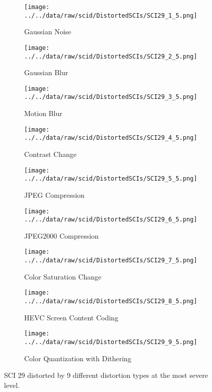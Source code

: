 \begin{figure}[h!]
    \centering
    \begin{subfigure}[b]{0.42\textwidth}
        \texttt{[image: ../../data/raw/scid/DistortedSCIs/SCI29\_1\_5.png]}
        \caption{Gaussian Noise}
        \label{fig:distortion_type_1}
    \end{subfigure}
    \hfill
    \begin{subfigure}[b]{0.42\textwidth}
        \texttt{[image: ../../data/raw/scid/DistortedSCIs/SCI29\_2\_5.png]}
        \caption{Gaussian Blur}
        \label{fig:distortion_type_2}
    \end{subfigure}
    \newline
    \begin{subfigure}[b]{0.42\textwidth}
        \texttt{[image: ../../data/raw/scid/DistortedSCIs/SCI29\_3\_5.png]}
        \caption{Motion Blur}
        \label{fig:distortion_type_3}
    \end{subfigure}
    \hfill
    \begin{subfigure}[b]{0.42\textwidth}
        \texttt{[image: ../../data/raw/scid/DistortedSCIs/SCI29\_4\_5.png]}
        \caption{Contrast Change}
        \label{fig:distortion_type_4}
    \end{subfigure}
    \newline
    \begin{subfigure}[b]{0.42\textwidth}
        \texttt{[image: ../../data/raw/scid/DistortedSCIs/SCI29\_5\_5.png]}
        \caption{JPEG Compression}
        \label{fig:distortion_type_5}
    \end{subfigure}
    \hfill
    \begin{subfigure}[b]{0.42\textwidth}
        \texttt{[image: ../../data/raw/scid/DistortedSCIs/SCI29\_6\_5.png]}
        \caption{JPEG2000 Compression}
        \label{fig:distortion_type_6}
    \end{subfigure}
    \newline
    \begin{subfigure}[b]{0.42\textwidth}
        \texttt{[image: ../../data/raw/scid/DistortedSCIs/SCI29\_7\_5.png]}
        \caption{Color Saturation Change}
        \label{fig:distortion_type_7}
    \end{subfigure}
    \hfill
    \begin{subfigure}[b]{0.42\textwidth}
        \texttt{[image: ../../data/raw/scid/DistortedSCIs/SCI29\_8\_5.png]}
        \caption{HEVC Screen Content Coding}
        \label{fig:distortion_type_8}
    \end{subfigure}
    \newline
    \begin{subfigure}[b]{0.42\textwidth}
        \texttt{[image: ../../data/raw/scid/DistortedSCIs/SCI29\_9\_5.png]}
        \caption{Color Quantization with Dithering}
        \label{fig:distortion_type_9}
    \end{subfigure}
    \caption{SCI 29 distorted by 9 different distortion types at the most severe level.}
    \label{fig:distortion_types}
\end{figure}

